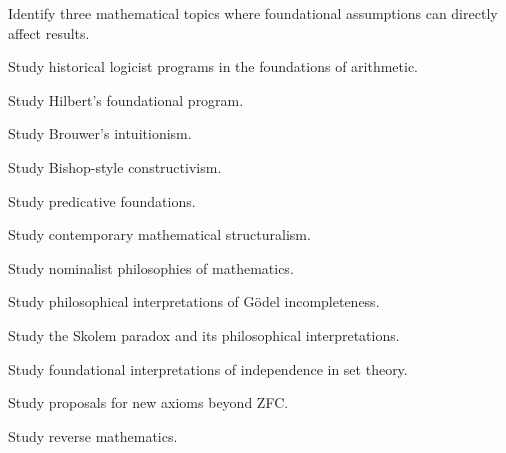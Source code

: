 \begin{exercise}[3]
Identify three mathematical topics where foundational assumptions can
directly affect results.
\end{exercise}

\begin{exercise}[4]
Study historical logicist programs in the foundations of arithmetic.
\end{exercise}

\begin{exercise}[4]
Study Hilbert's foundational program.
\end{exercise}

\begin{exercise}[4]
Study Brouwer's intuitionism.
\end{exercise}

\begin{exercise}[4]
Study Bishop-style constructivism.
\end{exercise}

\begin{exercise}[4]
Study predicative foundations.
\end{exercise}

\begin{exercise}[4]
Study contemporary mathematical structuralism.
\end{exercise}

\begin{exercise}[4]
Study nominalist philosophies of mathematics.
\end{exercise}

\begin{exercise}[4]
Study philosophical interpretations of Gödel incompleteness.
\end{exercise}

\begin{exercise}[4]
Study the Skolem paradox and its philosophical interpretations.
\end{exercise}

\begin{exercise}[4]
Study foundational interpretations of independence in set theory.
\end{exercise}

\begin{exercise}[4]
Study proposals for new axioms beyond ZFC.
\end{exercise}

\begin{exercise}[4]
Study reverse mathematics.
\end{exercise}

